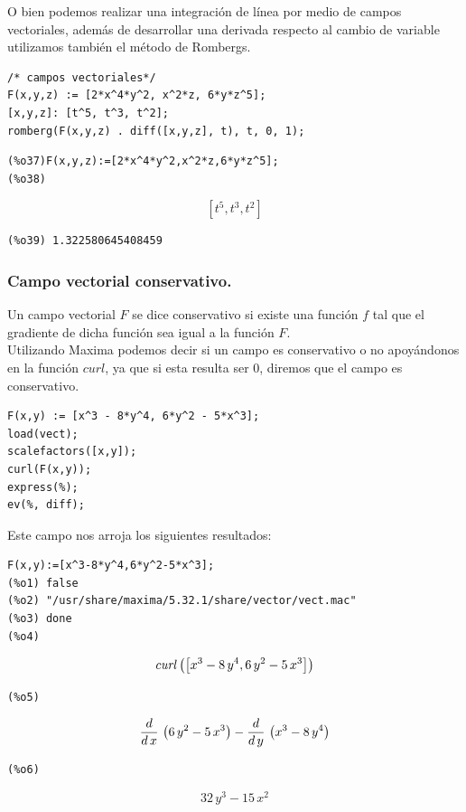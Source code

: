 \documentclass[12pt]{article}
\begin{document}
O bien podemos realizar una integración de línea por medio de campos vectoriales, además de desarrollar una derivada respecto al cambio de variable utilizamos también el método de Rombergs.

\begin{verbatim}
/* campos vectoriales*/
F(x,y,z) := [2*x^4*y^2, x^2*z, 6*y*z^5];
[x,y,z]: [t^5, t^3, t^2];
romberg(F(x,y,z) . diff([x,y,z], t), t, 0, 1);
\end{verbatim}

\begin{verbatim}
(%o37)F(x,y,z):=[2*x^4*y^2,x^2*z,6*y*z^5];
(%o38) 
\end{verbatim}
$$\left[ t^5 , t^3 , t^2 \right] $$
\begin{verbatim}
(%o39) 1.322580645408459
\end{verbatim}

\pagebreak
\subsubsection*{Campo vectorial conservativo.}

Un campo vectorial $F$ se dice conservativo si existe una función $f$ tal que el gradiente de dicha función sea igual a la función $F$.\\

Utilizando Maxima podemos decir si un campo es conservativo o no apoyándonos en la función $curl$, ya que si esta resulta ser $0$, diremos que el campo es conservativo.

\begin{verbatim}
F(x,y) := [x^3 - 8*y^4, 6*y^2 - 5*x^3];
load(vect);
scalefactors([x,y]);
curl(F(x,y));
express(%);
ev(%, diff);
\end{verbatim}

Este campo nos arroja los siguientes resultados:

\begin{verbatim}
F(x,y):=[x^3-8*y^4,6*y^2-5*x^3];
(%o1) false
(%o2) "/usr/share/maxima/5.32.1/share/vector/vect.mac"
(%o3) done
(%o4)
\end{verbatim}
$${\it curl}\left(\left[ x^3-8\,y^4 , 6\,y^2-5\,x^3 \right] \right)$$
\begin{verbatim}
(%o5)
\end{verbatim}
$${{d}\over{d\,x}}\,\left(6\,y^2-5\,x^3\right)-{{d}\over{d\,y}}\,
 \left(x^3-8\,y^4\right)$$
\begin{verbatim} 
(%o6) 
\end{verbatim}
$$32\,y^3-15\,x^2$$
\end{document}
